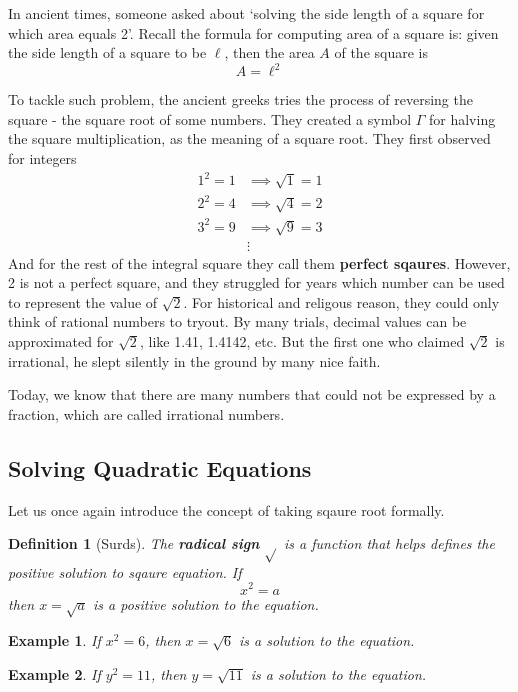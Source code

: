 \documentclass[12pt]{article}
\newtheorem{definition}{Definition}[section]
\newtheorem*{example}{Example}
\begin{document}
    In ancient times, someone asked about `solving the side length of a square for which area equals 2'. Recall the formula for computing area of a square is: given the side length of a square to be $\ell$, then the area $A$ of the square is \[A=\ell^2\]

    To tackle such problem, the ancient greeks tries the process of reversing the square - the square root of some numbers. They created a symbol \(\Gamma\) for halving the square multiplication, as the meaning of a square root. They first observed for integers \begin{align*}
        1^2=1 &\implies \sqrt{1} = 1\\
        2^2=4 &\implies \sqrt{4} = 2\\
        3^2=9 &\implies \sqrt{9} = 3\\
        &\vdots
    \end{align*}
    And for the rest of the integral square they call them \textbf{perfect sqaures}. However, 2 is not a perfect square, and they struggled for years which number can be used to represent the value of \(\sqrt{2}\). For historical and religous reason, they could only think of rational numbers to tryout. By many trials, decimal values can be approximated for \(\sqrt{2}\), like 1.41, 1.4142, etc. But the first one who claimed \(\sqrt{2}\) is irrational, he slept silently in the ground by many nice faith.

    Today, we know that there are many numbers that could not be expressed by a fraction, which are called irrational numbers.

    \subsection{Solving Quadratic Equations}

    Let us once again introduce the concept of taking sqaure root formally.

    \begin{definition}[Surds]
        The \textbf{radical sign} \(\sqrt{}\) is a function that helps defines the positive solution to sqaure equation. If \[x^2=a\] then \(x=\sqrt{a}\) is a positive solution to the equation.
    \end{definition}

    \begin{example}
        If $x^2=6$, then $x=\sqrt{6}$ is a solution to the equation.
    \end{example}

    \begin{example}
        If $y^2=11$, then $y=\sqrt{11}$ is a solution to the equation.
    \end{example}
\end{document}
